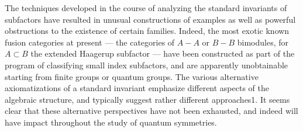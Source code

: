 \documentclass[12pt]{article}
\begin{document}
The techniques developed in the course of analyzing the standard invariants of
subfactors have resulted in unusual constructions of examples as well as
powerful obstructions to the existence of certain families. Indeed, the most
exotic known fusion categories at present --- the categories of $A-A$ or $B-B$
bimodules, for $A \subset B$ the extended Haagerup subfactor ---  have been
constructed as part of the program of classifying small index subfactors, and are apparently
unobtainable starting from finite groups or quantum groups.
The various alternative axiomatizations of a standard invariant emphasize
different aspects of the algebraic structure, and typically suggest rather
different approaches1. It seems clear that
these alternative perspectives have not been exhausted, and indeed will have
impact throughout the study of quantum symmetries. 
\end{document}
